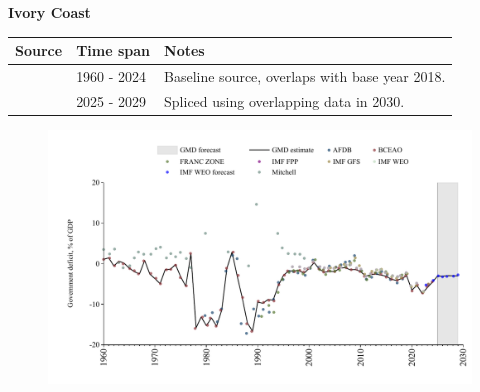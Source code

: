 \documentclass[12pt,a4paper,landscape]{article}
\begin{document}
\begin{adjustbox}{max totalsize={\paperwidth}{\paperheight},center}
\begin{minipage}[t][\textheight][t]{\textwidth}
\vspace*{0.5cm}
{}
\begin{center}
{\Large\bfseries Ivory Coast}
\end{center}
\vspace{0.5cm}
\begin{table}[H]
\centering
\small
\begin{tabular}{|l|l|l|}
\hline
\textbf{Source} & \textbf{Time span} & \textbf{Notes} \\
\hline
\rowcolor{white}\cite{BCEAO}& 1960 - 2024 &Baseline source, overlaps with base year 2018.\\
\rowcolor{lightgray}\cite{IMF_WEO_forecast}& 2025 - 2029 &Spliced using overlapping data in 2030.\\
\hline
\end{tabular}
\end{table}
\begin{figure}[H]
\centering
\includegraphics[width=\textwidth,height=0.6\textheight,keepaspectratio]{graphs/CIV_govdef_GDP.pdf}
\end{figure}
\end{minipage}
\end{adjustbox}
\end{document}
